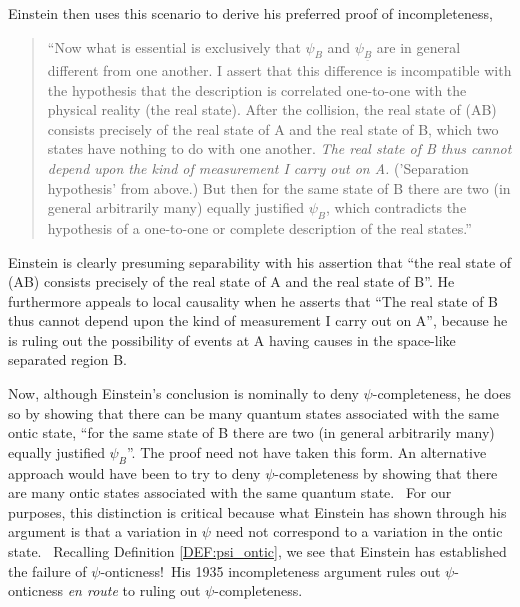 \documentclass[aps,nofootinbib,12pt]{revtex4-2}
\begin{document}
Einstein then uses this scenario to derive his preferred proof of
incompleteness,


\begin{quote}
``Now what is essential is exclusively that $\psi_{B}$ and
$\psi_{\underline{B}}$ are in general different from one another. I
assert that this difference is incompatible with the hypothesis that
the description is correlated one-to-one with the physical reality
(the real state). After the collision, the real state of (AB)
consists precisely of the real state of A and the real state of B,
which two states have nothing to do with one another. \emph{The real
state of B thus cannot depend upon the kind of measurement I carry
out on A.} ('Separation hypothesis' from above.) But then for the
same state of B there are two (in general arbitrarily many) equally
justified $\psi_{B}$, which contradicts the hypothesis of a
one-to-one or complete description of the real states.''
\end{quote}

Einstein is clearly presuming separability with his assertion that
``the real state of (AB) consists precisely of the real state of A
and the real state of B''.
He furthermore appeals to local causality when he asserts that ``The
real state of B thus cannot depend upon the kind of measurement I
carry out on A'', because he is ruling out the possibility of events
at A having causes in the space-like separated region B.

Now, although Einstein's conclusion is nominally to deny
$\psi$-completeness, he does so by showing that there can be many
quantum states associated with the same ontic state, ``for the same
state of B there are two (in general arbitrarily many) equally
justified $\psi_{B}$''. The proof need not have taken this form. An
alternative approach would have been to try to deny
$\psi$-completeness by showing that there are many ontic states
associated with the same quantum state. \ For our purposes, this
distinction is critical because what Einstein has shown through his
argument is that a variation in $\psi$ need not correspond to a
variation in the ontic state. \ Recalling Definition
\ref{DEF:psi_ontic}, we see that Einstein has established the
failure of $\psi $-onticness!\ His 1935 incompleteness argument
rules out $\psi$-onticness \emph{en route} to ruling out
$\psi$-completeness.
\end{document}

